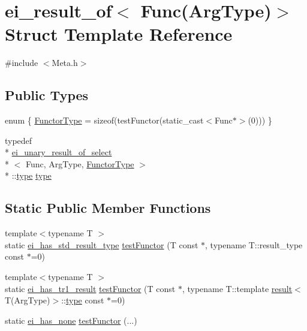 \hypertarget{structei__result__of_3_01_func_07_arg_type_08_4}{\section{ei\-\_\-result\-\_\-of$<$ Func(Arg\-Type)$>$ Struct Template Reference}
\label{structei__result__of_3_01_func_07_arg_type_08_4}
}


{\ttfamily \#include $<$Meta.\-h$>$}

\subsection*{Public Types}
\begin{DoxyCompactItemize}
\item 
enum \{ \hyperlink{structei__result__of_3_01_func_07_arg_type_08_4_acbb3bb6ad0e452c8577ef88c444d5566a6085dc539a5ca6f310f1d481b7c0dd1a}{Functor\-Type} = sizeof(test\-Functor(static\-\_\-cast$<$Func$\ast$$>$(0)))
 \}
\item 
typedef \\*
\hyperlink{structei__unary__result__of__select}{ei\-\_\-unary\-\_\-result\-\_\-of\-\_\-select}\\*
$<$ Func, Arg\-Type, \hyperlink{structei__result__of_3_01_func_07_arg_type_08_4_acbb3bb6ad0e452c8577ef88c444d5566a6085dc539a5ca6f310f1d481b7c0dd1a}{Functor\-Type} $>$\\*
\-::\hyperlink{structei__result__of_3_01_func_07_arg_type_08_4_a3275fde7dfaab9126b7149dcc91df84e}{type} \hyperlink{structei__result__of_3_01_func_07_arg_type_08_4_a3275fde7dfaab9126b7149dcc91df84e}{type}
\end{DoxyCompactItemize}
\subsection*{Static Public Member Functions}
\begin{DoxyCompactItemize}
\item 
{\footnotesize template$<$typename T $>$ }\\static \hyperlink{structei__has__std__result__type}{ei\-\_\-has\-\_\-std\-\_\-result\-\_\-type} \hyperlink{structei__result__of_3_01_func_07_arg_type_08_4_afbe426f52ae3ea12417f4c3c35c6d09b}{test\-Functor} (T const $\ast$, typename T\-::result\-\_\-type const $\ast$=0)
\item 
{\footnotesize template$<$typename T $>$ }\\static \hyperlink{structei__has__tr1__result}{ei\-\_\-has\-\_\-tr1\-\_\-result} \hyperlink{structei__result__of_3_01_func_07_arg_type_08_4_ae553ece79bf2ee94520323856abc2309}{test\-Functor} (T const $\ast$, typename T\-::template \hyperlink{qxtslotjob_8h_aab161efab0511ea9612b64c40e9852ca}{result}$<$ T(Arg\-Type)$>$\-::\hyperlink{structei__result__of_3_01_func_07_arg_type_08_4_a3275fde7dfaab9126b7149dcc91df84e}{type} const $\ast$=0)
\item 
static \hyperlink{structei__has__none}{ei\-\_\-has\-\_\-none} \hyperlink{structei__result__of_3_01_func_07_arg_type_08_4_a4ad34b148a319fc4327a31c5847bfc87}{test\-Functor} (...)
\end{DoxyCompactItemize}


